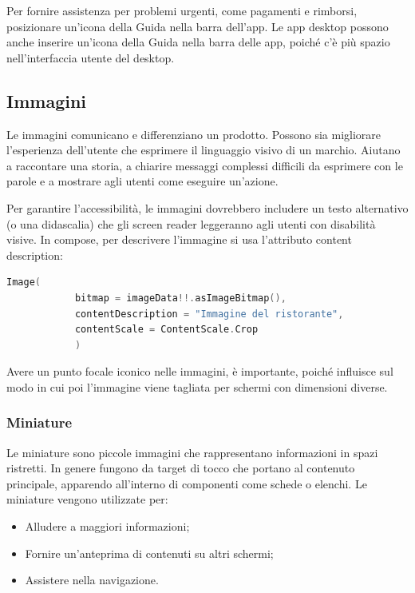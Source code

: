 \documentclass[12pt, a4paper]{report}
\begin{document}
	Per fornire assistenza per problemi urgenti, come pagamenti e rimborsi, posizionare un'icona della Guida nella barra dell'app. Le app desktop possono anche inserire un'icona della Guida nella barra delle app, poiché c'è più spazio nell'interfaccia utente del desktop.

	\subsection{Immagini}
	Le immagini comunicano e differenziano un prodotto. Possono sia migliorare l'esperienza dell'utente che esprimere il linguaggio visivo di un marchio. Aiutano a raccontare una storia, a chiarire messaggi complessi difficili da esprimere con le parole e a mostrare
	agli utenti come eseguire un'azione.

	Per garantire l'accessibilità, le immagini dovrebbero includere un testo alternativo (o una didascalia) che gli screen reader leggeranno agli utenti con disabilità visive. In compose, per descrivere l'immagine si usa l'attributo content description:

\begin{lstlisting}[language=Kotlin]
	Image(
			bitmap = imageData!!.asImageBitmap(),
            contentDescription = "Immagine del ristorante",
            contentScale = ContentScale.Crop
            )
\end{lstlisting}


Avere un punto focale iconico nelle immagini, è importante, poiché influisce sul modo in cui poi l’immagine viene tagliata per schermi con dimensioni diverse.


	\subsubsection{Miniature}
	Le miniature sono piccole immagini che rappresentano informazioni in spazi ristretti. In genere fungono da target di tocco che portano al contenuto principale, apparendo all'interno di componenti come schede o elenchi. Le miniature vengono utilizzate per:
	\begin{itemize}
		\item Alludere a maggiori informazioni;
		\item Fornire un’anteprima di contenuti su altri schermi;
		\item Assistere nella navigazione.
	\end{itemize}
\end{document}
